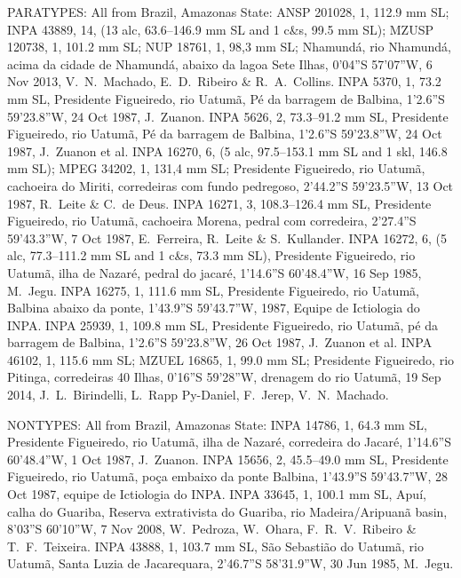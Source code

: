 \documentclass[12pt]{article}
\begin{document}
\noindent PARATYPES: All from Brazil, Amazonas State: ANSP 201028, 1, 112.9 mm SL; INPA 43889, 14, (13 alc, 63.6--146.9 mm SL and 1 c\&s, 99.5 mm SL); MZUSP 120738, 1, 101.2 mm SL; NUP 18761, 1, 98,3 mm SL; Nhamundá, rio Nhamundá, acima da cidade de Nhamundá, abaixo da lagoa Sete Ilhas, 0'04''S 57'07''W, 6 Nov 2013, V.\ N.\ Machado, E.\ D.\ Ribeiro \& R.\ A.\ Collins. %
INPA 5370, 1, 73.2 mm SL, Presidente Figueiredo, rio Uatumã, Pé da barragem de Balbina, 1’2.6”S 59’23.8”W, 24 Oct 1987, J.\ Zuanon. %
INPA 5626, 2, 73.3--91.2 mm SL, Presidente Figueiredo, rio Uatumã, Pé da barragem de Balbina, 1’2.6”S 59’23.8”W, 24 Oct 1987, J.\ Zuanon et al. %
INPA 16270, 6, (5 alc, 97.5--153.1 mm SL and 1 skl, 146.8 mm SL); MPEG 34202, 1, 131,4 mm SL; Presidente Figueiredo, rio Uatumã, cachoeira do Miriti, corredeiras com fundo pedregoso, 2’44.2”S 59’23.5”W, 13 Oct 1987, R.\ Leite \& C.\ de Deus. %
INPA 16271, 3, 108.3--126.4 mm SL, Presidente Figueiredo, rio Uatumã, cachoeira Morena, pedral com corredeira, 2’27.4”S 59’43.3”W, 7 Oct 1987, E.\ Ferreira, R.\ Leite \& S.\ Kullander. %
INPA 16272, 6, (5 alc, 77.3--111.2 mm SL and 1 c\&s, 73.3 mm SL), Presidente Figueiredo, rio Uatumã, ilha de Nazaré, pedral do jacaré, 1’14.6”S 60’48.4”W, 16 Sep 1985, M.\ Jegu. %
INPA 16275, 1, 111.6 mm SL, Presidente Figueiredo, rio Uatumã, Balbina abaixo da ponte, 1’43.9”S 59’43.7”W, 1987, Equipe de Ictiologia do INPA. %
INPA 25939, 1, 109.8 mm SL, Presidente Figueiredo, rio Uatumã, pé da barragem de Balbina, 1’2.6”S 59’23.8”W, 26 Oct 1987, J.\ Zuanon et al. %
INPA 46102, 1, 115.6 mm SL; MZUEL 16865, 1, 99.0 mm SL; Presidente Figueiredo, rio Pitinga, corredeiras 40 Ilhas, 0’16”S 59’28”W, drenagem do rio Uatumã, 19 Sep 2014, J.\ L.\ Birindelli, L.\ Rapp Py-Daniel, F.\ Jerep, V.\ N.\ Machado.\\
\bigskip

\noindent NONTYPES: All from Brazil, Amazonas State: %
INPA 14786, 1, 64.3 mm SL, Presidente Figueiredo, rio Uatumã, ilha de Nazaré, corredeira do Jacaré, 1’14.6”S 60’48.4”W, 1 Oct 1987, J.\ Zuanon. %
INPA 15656, 2, 45.5--49.0 mm SL, Presidente Figueiredo, rio Uatumã, poça embaixo da ponte Balbina, 1’43.9”S 59’43.7”W, 28 Oct 1987, equipe de Ictiologia do INPA. %
INPA 33645, 1, 100.1 mm SL, Apuí, calha do Guariba, Reserva extrativista do Guariba, rio Madeira/Aripuanã basin, 8’03”S 60’10”W, 7 Nov 2008, W.\ Pedroza, W.\ Ohara, F.\ R.\ V.\ Ribeiro \& T.\ F.\ Teixeira. %
INPA 43888, 1, 103.7 mm SL, São Sebastião do Uatumã, rio Uatumã, Santa Luzia de Jacarequara, 2’46.7”S 58’31.9”W, 30 Jun 1985, M.\ Jegu.\\%
\bigskip
\end{document}
